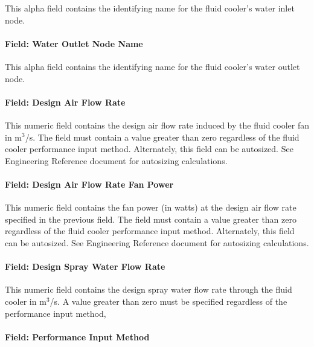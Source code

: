 This alpha field contains the identifying name for the fluid cooler's water inlet node.

\paragraph{Field: Water Outlet Node Name}\label{field-water-outlet-node-name-4}

This alpha field contains the identifying name for the fluid cooler's water outlet node.

\paragraph{Field: Design Air Flow Rate}\label{field-design-air-flow-rate-3}

This numeric field contains the design air flow rate induced by the fluid cooler fan in m\(^{3}\)/s. The field must contain a value greater than zero regardless of the fluid cooler performance input method. Alternately, this field can be autosized. See Engineering Reference document for autosizing calculations.

\paragraph{Field: Design Air Flow Rate Fan Power}\label{field-design-air-flow-rate-fan-power}

This numeric field contains the fan power (in watts) at the design air flow rate specified in the previous field. The field must contain a value greater than zero regardless of the fluid cooler performance input method. Alternately, this field can be autosized. See Engineering Reference document for autosizing calculations.

\paragraph{Field: Design Spray Water Flow Rate}\label{field-design-spray-water-flow-rate}

This numeric field contains the design spray water flow rate through the fluid cooler in m\(^{3}\)/s. A value greater than zero must be specified regardless of the performance input method,

\paragraph{Field: Performance Input Method}\label{field-performance-input-method-3}

